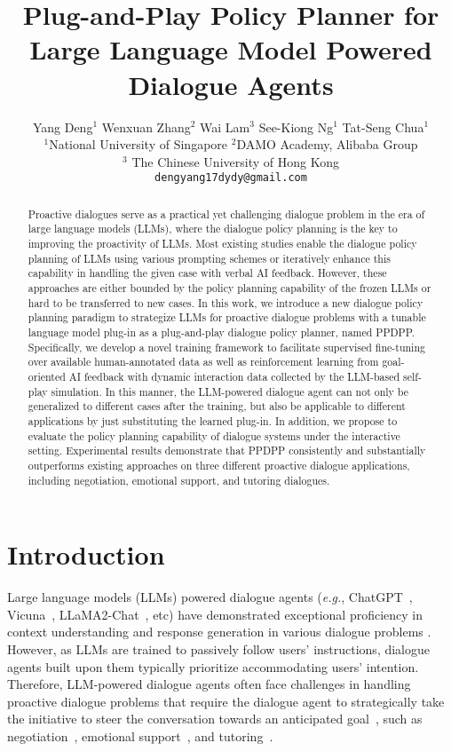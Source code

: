 \documentclass{article} %
\title{Plug-and-Play Policy Planner for Large Language Model Powered Dialogue Agents}
\author{Yang Deng$^1$ \quad Wenxuan Zhang$^2$ \quad Wai Lam$^3$ \quad See-Kiong Ng$^1$ \quad Tat-Seng Chua$^1$\\
$^1$National University of Singapore \quad $^2$DAMO Academy, Alibaba Group \\
$^3$ The Chinese University of Hong Kong\\
\texttt{dengyang17dydy@gmail.com} \\
}
\begin{document}
\maketitle

\begin{abstract}
Proactive dialogues serve as a practical yet challenging dialogue problem in the era of large language models (LLMs), where the dialogue policy planning is the key to improving the proactivity of LLMs. 
Most existing studies enable the dialogue policy planning of LLMs using various prompting schemes or iteratively enhance this capability in handling the given case with verbal AI feedback. However, these approaches are either bounded by the policy planning capability of the frozen LLMs or hard to be transferred to new cases. 
In this work, we introduce a new dialogue policy planning paradigm to strategize LLMs for proactive dialogue problems with a tunable language model plug-in as a plug-and-play dialogue policy planner, named PPDPP. 
Specifically, we develop a novel training framework to facilitate supervised fine-tuning over available human-annotated data as well as reinforcement learning from goal-oriented AI feedback with dynamic interaction data collected by the LLM-based self-play simulation. 
In this manner, the LLM-powered dialogue agent can not only be generalized to different cases after the training, but also be applicable to different applications by just substituting the learned plug-in. 
In addition, we propose to evaluate the policy planning capability of dialogue systems under the interactive setting. 
Experimental results demonstrate that PPDPP consistently and substantially outperforms existing approaches on three different proactive dialogue applications, including negotiation, emotional support, and tutoring dialogues. 
\end{abstract}


\section{Introduction}

Large language models (LLMs) powered dialogue agents (\textit{e.g.}, ChatGPT~\citep{instructgpt}, Vicuna~\citep{vicuna2023}, LLaMA2-Chat~\citep{llama2}, etc) have demonstrated exceptional proficiency in context understanding and response generation in various dialogue problems \citep{mmmeval-chatgpt,zhang2023sgptod,chatgpt-emo-dial}.  
However, as LLMs are trained to passively follow users' instructions, dialogue agents built upon them typically prioritize accommodating users' intention. 
Therefore, LLM-powered dialogue agents often face challenges in handling proactive dialogue problems that require the dialogue agent to strategically take the initiative to steer the conversation towards an anticipated goal~\citep{proactive-survey}, such as negotiation~\citep{negotiate-survey}, emotional support~\citep{esconv}, and tutoring~\citep{eacl23-tutor}. 
\end{document}
